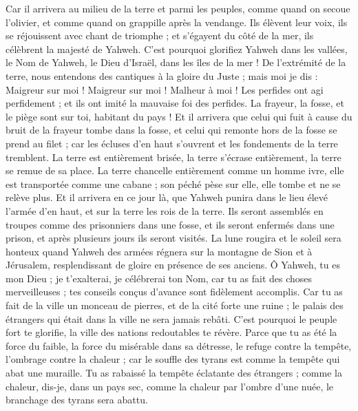 \begin{multicols}{2}
Car il arrivera au milieu de la terre et parmi les peuples, comme quand on secoue l'olivier, et comme quand on grappille après la vendange.
Ils élèvent leur voix, ils se réjouissent avec chant de triomphe ; et s'égayent du côté de la mer, ils célèbrent la majesté de Yahweh.
C'est pourquoi glorifiez Yahweh dans les vallées, le Nom de Yahweh, le Dieu d'Israël, dans les îles de la mer !
De l'extrémité de la terre, nous entendons des cantiques à la gloire du Juste ; mais moi je dis : Maigreur sur moi ! Maigreur sur moi ! Malheur à moi ! Les perfides ont agi perfidement ; et ils ont imité la mauvaise foi des perfides.
La frayeur, la fosse, et le piège sont sur toi, habitant du pays !
Et il arrivera que celui qui fuit à cause du bruit de la frayeur tombe dans la fosse, et celui qui remonte hors de la fosse se prend au filet ; car les écluses d'en haut s'ouvrent et les fondements de la terre tremblent.
La terre est entièrement brisée, la terre s'écrase entièrement, la terre se remue de sa place.
La terre chancelle entièrement comme un homme ivre, elle est transportée comme une cabane ; son péché pèse sur elle, elle tombe et ne se relève plus.
Et il arrivera en ce jour là, que Yahweh punira dans le lieu élevé l'armée d'en haut, et sur la terre les rois de la terre.
Ils seront assemblés en troupes comme des prisonniers dans une fosse, et ils seront enfermés dans une prison, et après plusieurs jours ils seront visités.
La lune rougira et le soleil sera honteux quand Yahweh des armées régnera sur la montagne de Sion et à Jérusalem, resplendissant de gloire en présence de ses anciens.
\VerseOne{}Ô Yahweh, tu es mon Dieu ; je t'exalterai, je célébrerai ton Nom, car tu as fait des choses merveilleuses ; tes conseils conçus d'avance sont fidèlement accomplis.
Car tu as fait de la ville un monceau de pierres, et de la cité forte une ruine ; le palais des étrangers qui était dans la ville ne sera jamais rebâti.
C'est pourquoi le peuple fort te glorifie, la ville des nations redoutables te révère.
Parce que tu as été la force du faible, la force du misérable dans sa détresse, le refuge contre la tempête, l'ombrage contre la chaleur ; car le souffle des tyrans est comme la tempête qui abat une muraille.
Tu as rabaissé la tempête éclatante des étrangers ; comme la chaleur, dis-je, dans un pays sec, comme la chaleur par l'ombre d'une nuée, le branchage des tyrans sera abattu.

\end{multicols}
